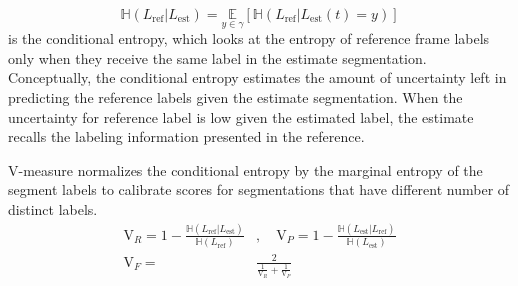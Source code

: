 $$\mathbb{H}(L_\text{ref} | L_\text{est}) = \underset{y\in\gamma}{\mathbb{E}}[\mathbb{H}(L_\text{ref} | L_\text{est}(t) = y)]$$
is the conditional entropy, which looks at the entropy of reference frame labels only when they receive the same label in the estimate segmentation.
Conceptually, the conditional entropy estimates the amount of uncertainty left in predicting the reference labels given the estimate segmentation.
When the uncertainty for reference label is low given the estimated label, the estimate recalls the labeling information presented in the reference.

V-measure normalizes the conditional entropy by the marginal entropy of the segment labels to calibrate scores for segmentations that have different number of distinct labels.
\begin{align*}
\text{V}_R = 1 - \frac{\mathbb{H}(L_\text{ref} | L_\text{est})}{\mathbb{H}(L_\text{ref})}&, \quad
\text{V}_P = 1 - \frac{\mathbb{H}(L_\text{est} | L_\text{ref})}{\mathbb{H}(L_\text{est})} \\
\text{V}_F = &\frac{2}{\frac1{\text{V}_R} + \frac1{\text{V}_P}}
\end{align*}
